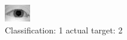 \begin{figure}[h!]
\begin{center}
\includegraphics[width=0.60\columnwidth]{figures/ID895_class_1_target_2.png}
\end{center}
\caption{ Classification: 1 actual target: 2}
\label{fig:ID895_class_1_target_2}
\end{figure}
